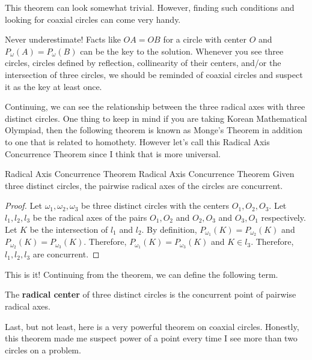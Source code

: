 \documentclass[../../main.tex]{subfiles}
\begin{document}
This theorem can look somewhat trivial. However, finding such
conditions and looking for coaxial circles can come very handy.

\begin{important}
Never underestimate! Facts like $OA = OB$ for a circle with center
$O$ and $P_\omega(A) = P_\omega(B)$ can be the key to the solution.
Whenever you see three circles, circles defined by reflection,
collinearity of their centers, and/or the intersection of three
circles, we should be reminded of coaxial circles and suspect it as
the key at least once.
\end{important}

Continuing, we can see the relationship between the three radical
axes with three distinct circles. One thing to keep in mind if you
are taking Korean Mathematical Olympiad, then the following theorem
is known as Monge's Theorem in addition to one that is related to
homothety. However let's call this Radical Axis Concurrence Theorem
since I think that is more universal.

\begin{theorem}
{Radical Axis Concurrence Theorem}
{Radical Axis Concurrence Theorem}
Given three distinct circles, the pairwise radical axes of the
circles are concurrent.
\end{theorem}
\begin{proof}
Let $\omega_1, \omega_2, \omega_3$ be three distinct circles with
the centers $O_1, O_2, O_3$. Let $l_1, l_2, l_3$ be the radical
axes of the pairs $O_1, O_2$ and $O_2, O_3$ and $O_3, O_1$
respectively. Let $K$ be the intersection of $l_1$ and $l_2$.
By definition, $P_{\omega_1}(K) = P_{\omega_2}(K)$ and
$P_{\omega_2}(K) = P_{\omega_3}(K)$. Therefore, $P_{\omega_1}(K)
= P_{\omega_3}(K)$ and $K \in l_3$. Therefore, $l_1, l_2, l_3$
are concurrent.
\end{proof}

This is it! Continuing from the theorem, we can define the following
term.

\begin{definition}{}{}
The \textbf{radical center} of three distinct circles is the
concurrent point of pairwise radical axes.
\end{definition}

Last, but not least, here is a very powerful theorem on coaxial
circles. Honestly, this theorem made me suspect power of a point
every time I see more than two circles on a problem.
\end{document}
